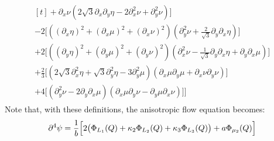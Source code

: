 \documentclass[reqno]{article}
\begin{document}
\begin{equation}
\begin{split}
\begin{multlined}[t]
	+ \partial_x \nu \left( 2 \sqrt3 \partial_x \partial_y \eta - 2 \partial_x^2 \nu + \partial_y^2 \nu \right)
	\biggr] \\
	- 2 \biggl[
	\left(\left(\partial_x \eta\right)^2 
	+ \left(\partial_x \mu\right)^2 
	+ \left(\partial_x \nu\right)^2\right)
	\left(\partial_y^2 \nu 
	+ \tfrac{2}{\sqrt3} \partial_y \partial_x \eta\right)
	\biggr] \\
	+ 2 \biggl[
	\left( \left(\partial_y \eta\right)^2 
	+ \left(\partial_y \mu\right)^2 
	+ \left(\partial_y \nu\right)^2\right)
	\left(\partial_x^2 \nu 
	- \tfrac{1}{\sqrt3} \partial_y \partial_x \eta
	+ \partial_y \partial_x \mu\right)
	\biggr] \\
	+ \tfrac23\biggl[
	\left(2 \sqrt3 \partial_x^2 \eta 
	+ \sqrt3 \partial_y^2 \eta 
	- 3 \partial_y^2 \mu \right) 
	\left(\partial_x \mu \partial_y \mu 
	+ \partial_x \nu \partial_y \nu \right)
	\biggr]\\
	+ 4 \biggl[\left(\partial_y^2 \nu 
	- 2 \partial_y \partial_x \mu\right) 
	\left(\partial_x \mu \partial_y \nu 
	-  \partial_y \mu \partial_x \nu\right) \biggr]
	\Biggr]
	\end{multlined}
\end{split}
\end{equation}
Note that, with these definitions, the anisotropic flow equation becomes:
\begin{equation}
	\partial^4 \psi = \frac{1}{b} \Bigl[
	2 \bigl( \Phi_{L_1} (Q) 
	+ \kappa_2 \Phi_{L_2} (Q)
	+ \kappa_3 \Phi_{L_3} (Q) \bigr)
	+ a \Phi_{\mu_2} (Q)
	\Bigr]
\end{equation}
\end{document}
